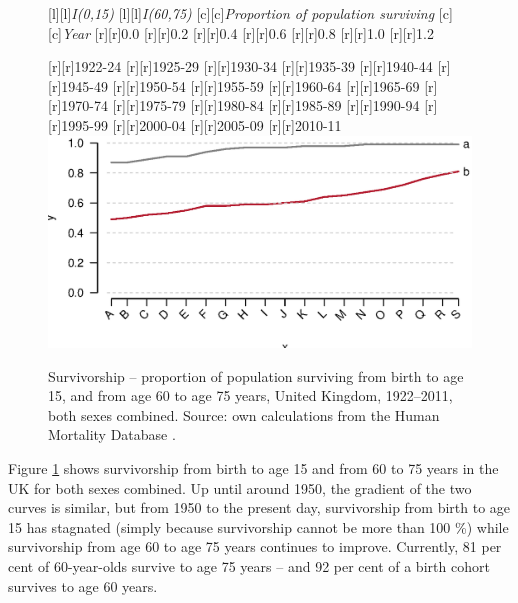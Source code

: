 \documentclass[11 pt, a4paper]{report}
\begin{document}
 
\begin{figure}[hbtp!]

[l][l]{\emph{I(0,15)}}
[l][l]{\emph{I(60,75)}}
[c][c]{\small{\emph{Proportion of population surviving}}}
[c][c]{\small{\emph{Year}}}
[r][r]{\small{0.0}}
[r][r]{\small{0.2}}
[r][r]{\small{0.4}}
[r][r]{\small{0.6}}
[r][r]{\small{0.8}}
[r][r]{\small{1.0}}
[r][r]{\small{1.2}}

[r][r]{\scriptsize{1922-24}}
[r][r]{\scriptsize{1925-29}}
[r][r]{\scriptsize{1930-34}}
[r][r]{\scriptsize{1935-39}}
[r][r]{\scriptsize{1940-44}}
[r][r]{\scriptsize{1945-49}}
[r][r]{\scriptsize{1950-54}}
[r][r]{\scriptsize{1955-59}}
[r][r]{\scriptsize{1960-64}}
[r][r]{\scriptsize{1965-69}}
[r][r]{\scriptsize{1970-74}}
[r][r]{\scriptsize{1975-79}}
[r][r]{\scriptsize{1980-84}}
[r][r]{\scriptsize{1985-89}}
[r][r]{\scriptsize{1990-94}}
[r][r]{\scriptsize{1995-99}}
[r][r]{\scriptsize{2000-04}}
[r][r]{\scriptsize{2005-09}}
[r][r]{\scriptsize{2010-11}}
\includegraphics[width=\textwidth]{../figures/Fig2.3.eps}

\caption{Survivorship -- proportion of population surviving from birth to age 15, and from age 60 to age 75 years, United Kingdom, 1922--2011, both sexes combined. Source: own calculations from the Human Mortality Database \citep{Lees2014}.}
\label{Fig:9}
\end{figure}
Figure \ref{Fig:9} shows survivorship from birth to age 15 and from 60 to 75 years in the UK for both sexes combined. Up until around 1950, the gradient of the two curves is similar, but from 1950 to the present day, survivorship from birth to age 15 has stagnated (simply because survivorship cannot be more than 100 \%) while survivorship from age 60 to age 75 years continues to improve. Currently, 81 per cent of 60-year-olds survive to age 75 years – and 92 per cent of a birth cohort survives to age 60 years.
\end{document}
